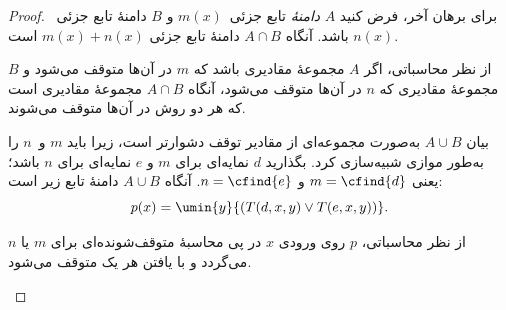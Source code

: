 \documentclass[../../../include/open-logic-section]{subfiles}
\begin{document}
\begin{proof}
برای برهان آخر، فرض کنید $A$ \emph{دامنهٔ} تابع جزئی~$m(x)$ و $B$
دامنهٔ تابع جزئی~$n(x)$ باشد. آنگاه $A\cap B$ دامنهٔ تابع جزئی
$m(x)+n(x)$ است.

\begin{explain}
از نظر محاسباتی، اگر $A$ مجموعهٔ مقادیری باشد که $m$ در آن‌ها متوقف
می‌شود و $B$ مجموعهٔ مقادیری که $n$ در آن‌ها متوقف می‌شود، آنگاه
$A\cap B$ مجموعهٔ مقادیری است که هر دو روش در آن‌ها متوقف می‌شوند.
\end{explain}

بیان $A\cup B$ به‌صورت مجموعه‌ای از مقادیر توقف دشوارتر است، زیرا
باید $m$ و~$n$ را به‌طور موازی شبیه‌سازی کرد. بگذارید $d$ نمایه‌ای
برای $m$ و $e$ نمایه‌ای برای $n$ باشد؛ یعنی $m=\cfind{d}$ و
$n=\cfind{e}$. آنگاه $A\cup B$ دامنهٔ تابع زیر است:
\[
p(x) = \umin{y}{(T(d,x,y) \lor T(e,x,y))}.
\]
\begin{explain}
از نظر محاسباتی، $p$ روی ورودی $x$ در پی محاسبهٔ متوقف‌شونده‌ای برای
$m$ یا $n$ می‌گردد و با یافتن هر یک متوقف می‌شود.
\end{explain}
\end{proof}
\end{document}
